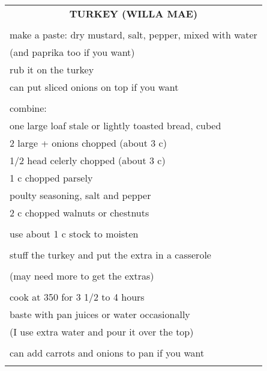 \documentclass[8pt]{report}
\begin{document}
\begin{tabular}{|l|} \hline	%
 
\multicolumn{1}{|c|}{\textbf{TURKEY (WILLA MAE)}}
\\
\\

\index{fish/meat!turkey (willa mae)} \index{turkey}

make a paste: dry mustard, salt, pepper, mixed with water\\
(and paprika too if you want) \\
rub it on the turkey \\
can put sliced onions on top if you want\\
\\
combine:\\
\hspace{0.5 in}	one large loaf stale or lightly toasted bread, cubed\\
\hspace{0.5 in}	2 large + onions chopped (about 3 c)\\
\hspace{0.5 in}	1/2 head celerly chopped (about 3 c)\\
\hspace{0.5 in}	1 c chopped parsely\\
\hspace{0.5 in}	poulty seasoning, salt and pepper\\
\hspace{0.5 in}	2 c chopped walnuts or chestnuts\\
\\
use about 1 c stock to moisten\\
\\
stuff the turkey and put the extra in a casserole\\
\\
(may need more to get the extras)\\
\\
cook at 350 for 3 1/2 to 4 hours\\
baste with pan juices or water occasionally\\
(I use extra water and pour it over the top)\\
\\
can add carrots and onions to pan if you want\\
\\

\end{tabular}
\end{document}
